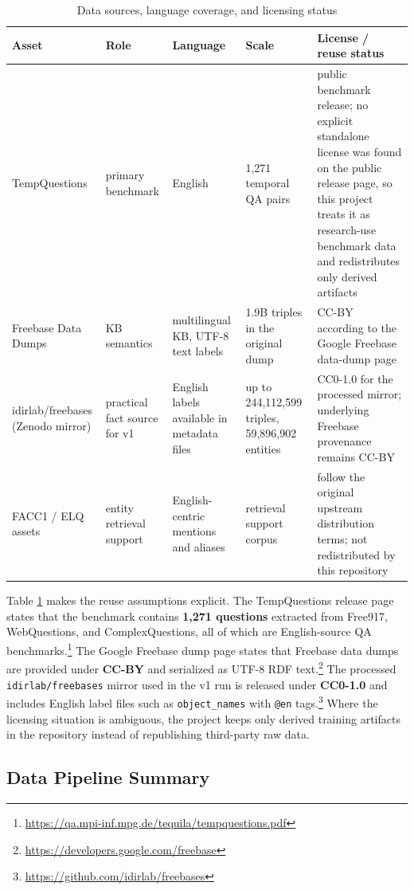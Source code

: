 \documentclass[a4paper,11pt]{article}
\begin{document}
\begin{table}[H]
\centering
\caption{Data sources, language coverage, and licensing status}
\label{tab:data-sources}
\begin{tabular}{p{3cm}p{2.2cm}p{2cm}p{2.8cm}p{3.5cm}}
\toprule
\textbf{Asset} & \textbf{Role} & \textbf{Language} & \textbf{Scale} & \textbf{License / reuse status} \\
\midrule
TempQuestions & primary benchmark & English & 1,271 temporal QA pairs & public benchmark release; no explicit standalone license was found on the public release page, so this project treats it as research-use benchmark data and redistributes only derived artifacts \\
Freebase Data Dumps & KB semantics & multilingual KB, UTF-8 text labels & 1.9B triples in the original dump & CC-BY according to the Google Freebase data-dump page \\
idirlab/freebases (Zenodo mirror) & practical fact source for v1 & English labels available in metadata files & up to 244,112,599 triples, 59,896,902 entities & CC0-1.0 for the processed mirror; underlying Freebase provenance remains CC-BY \\
FACC1 / ELQ assets & entity retrieval support & English-centric mentions and aliases & retrieval support corpus & follow the original upstream distribution terms; not redistributed by this repository \\
\bottomrule
\end{tabular}
\end{table}

Table \ref{tab:data-sources} makes the reuse assumptions explicit. The TempQuestions release page states that the benchmark contains \textbf{1,271 questions} extracted from Free917, WebQuestions, and ComplexQuestions, all of which are English-source QA benchmarks.\footnote{\url{https://qa.mpi-inf.mpg.de/tequila/tempquestions.pdf}} The Google Freebase dump page states that Freebase data dumps are provided under \textbf{CC-BY} and serialized as UTF-8 RDF text.\footnote{\url{https://developers.google.com/freebase}} The processed \texttt{idirlab/freebases} mirror used in the v1 run is released under \textbf{CC0-1.0} and includes English label files such as \texttt{object\_names} with \texttt{@en} tags.\footnote{\url{https://github.com/idirlab/freebases}} Where the licensing situation is ambiguous, the project keeps only derived training artifacts in the repository instead of republishing third-party raw data.

\subsection{Data Pipeline Summary}
\end{document}
